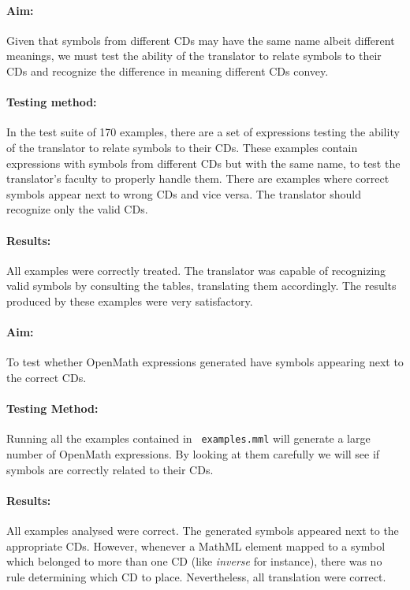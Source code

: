 \paragraph{Aim:} Given that symbols from different CDs may have the
same name albeit different meanings, we must test the ability of the
translator to relate symbols to their CDs and recognize the difference
in meaning different CDs convey.

\paragraph{Testing method:} In the test suite of 170 examples, there
are a set of expressions testing the ability of the translator to
relate symbols to their CDs. These examples contain expressions with
symbols from different CDs but with the same name, to test the
translator's faculty to properly handle them. There are examples
where correct symbols appear next to wrong CDs and vice versa. The
translator should recognize only the valid CDs.

\paragraph{Results:} All examples were correctly treated. The
translator was capable of recognizing valid symbols by consulting the tables, translating them
accordingly. The results produced by these examples were very satisfactory.

\paragraph{Aim:} To test whether OpenMath expressions generated have
symbols appearing next to the correct CDs.

\paragraph{Testing Method:} Running all the examples contained in {\tt 
examples.mml} will generate a large number of OpenMath expressions.
By looking at them carefully we will see if symbols are correctly
related to their CDs.

\paragraph{Results:} All examples analysed were correct. The generated
symbols appeared next to the appropriate CDs. However, whenever a
MathML element mapped to a symbol which belonged to more than one CD
(like {\it inverse} for instance), there was no rule determining which
CD to place. Nevertheless, all translation were correct.

